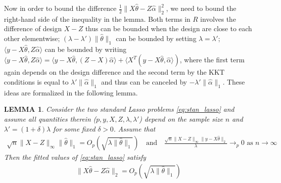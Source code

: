 \documentclass[a4paper]{article}
\newtheorem{lemma}{LEMMA}
\begin{document}
Now in order to bound the difference $\frac{1}{2}\|X\hat{\theta} - Z\hat{\alpha}\|_2^2$, we need to bound the right-hand side of the inequality in the lemma. Both terms in $R$ involves the difference of design $X-Z$ thus can be bounded when the design are close to each other elementwise; $(\lambda - \lambda')\|\hat{\theta}\|_1$ can be bounded by setting $\lambda = \lambda'$; $\langle y-X\hat{\theta}, Z\hat{\alpha}\rangle$ can be bounded by writing $\langle y-X\hat{\theta}, Z\hat{\alpha}\rangle = \langle y-X\hat{\theta}, (Z-X)\hat{\alpha} \rangle + \langle X^T(y-X\hat{\theta}, \hat{\alpha}\rangle)$, where the first term again depends on the design difference and the second term by the KKT conditions is equal to $\lambda'\|\hat{\alpha}\|_1$ and thus can be canceled by $-\lambda'\|\hat{\alpha}\|_1$. These ideas are formalized in the following lemma.

\begin{lemma}
Consider the two standard Lasso problems \eqref{eq:stan_lasso} and assume all quantities therein ($p, y, X,Z,\lambda,\lambda'$) depend on the sample size $n$ and $\lambda' = (1+\delta)\lambda$ for some fixed $\delta >0$. Assume that 
\begin{align}
\sqrt{n}\|X-Z\|_\infty\|\hat{\theta}\|_1 = O_p(\sqrt{\lambda\|\hat{\theta}\|_1}) \quad \text{and} \quad \frac{\sqrt{n}\|X-Z\|_\infty\|y-X\hat{\theta}\|_2}{\lambda} \rightarrow_p 0 \text{ as } n \rightarrow \infty
\label{eq:stan_lasso_cond}
\end{align}
Then the fitted values of \eqref{eq:stan_lasso} satisfy 
\begin{align}
\|X\hat{\theta} - Z\hat{\alpha}\|_2 = O_p(\sqrt{\lambda\|\hat{\theta}\|_1})
\end{align}
\label{lemma:lemma_2}
\end{lemma}
\end{document}
